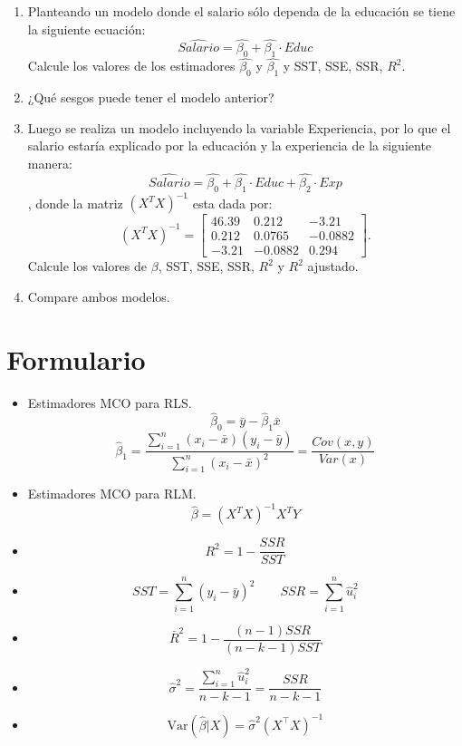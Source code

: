 \documentclass[10pt,a4paper]{article}
\begin{document}
\begin{enumerate}
\begin{enumerate}
    \item Planteando un modelo donde el salario sólo dependa de la educación se tiene la siguiente ecuación:
    $$\widehat{Salario} = \hat{\beta_0} + \hat{\beta_1} \cdot Educ$$
    Calcule los valores de los estimadores $\hat{\beta_0}$ y $\hat{\beta_1}$ y SST, SSE, SSR, $R^2$.
    \\


    \item  ¿Qué sesgos puede tener el modelo anterior?
    \\


    \item Luego se realiza un modelo incluyendo la variable Experiencia, por lo que el salario estaría explicado por la educación y la experiencia de la siguiente manera:
    $$\widehat{Salario} = \hat{\beta_0} + \hat{\beta_1} \cdot Educ + \hat{\beta_2} \cdot Exp$$, donde la matriz $(X^TX)^{-1}$ esta dada por:
      \[
(X^TX)^{-1}
= 
\begin{bmatrix}
46.39 & 0.212 & -3.21\\
0.212 & 0.0765 & -0.0882\\
-3.21 & -0.0882 & 0.294
\end{bmatrix}.
\] Calcule los valores de \textbf{${\beta}$}, SST, SSE, SSR, $R^2$ y $R^2$ ajustado.
    \\

    \item  Compare ambos modelos. 
    \\


\end{enumerate}

\end{enumerate}




\section{Formulario}


\begin{itemize}

\item  Estimadores MCO para RLS.
{
$$\hat{\beta}_0 = \bar{y} - \hat{\beta}_1 \bar{x} $$
$$\hat{\beta}_1 = \frac{\sum_{i=1}^{n}(x_i - \bar{x})(y_i-\bar{y})}{\sum_{i=1}^{n}(x_i - \bar{x})^2}=\frac{Cov(x,y)}{Var(x)}$$}


\item  Estimadores MCO para RLM.
{
$${\hat{\beta}} = (X^TX)^{-1} X^TY $$}


    \item \[ R^2  = 1 - \frac{SSR}{SST} \] 
\item  $$SST = \sum_{i=1}^{n} (y_i - \bar{y})^2 \quad \quad SSR = \sum_{i=1}^{n}  \hat{u}_i^2 $$
    \item \[ \bar{R}^2 =  1 - \frac{(n-1)SSR}{(n-k-1)SST} \]

    \item  $$\hat{\sigma}^2 = \frac{\sum_{i=1}^{n} \hat{u}_i^2 }{n-k-1}= \frac{SSR}{n - k - 1}$$
    \item \[
\text{Var}(\hat{\beta}|X) = \hat{\sigma}^2(X^{\top}X)^{-1}
\]
    \end{itemize}
\end{document}

